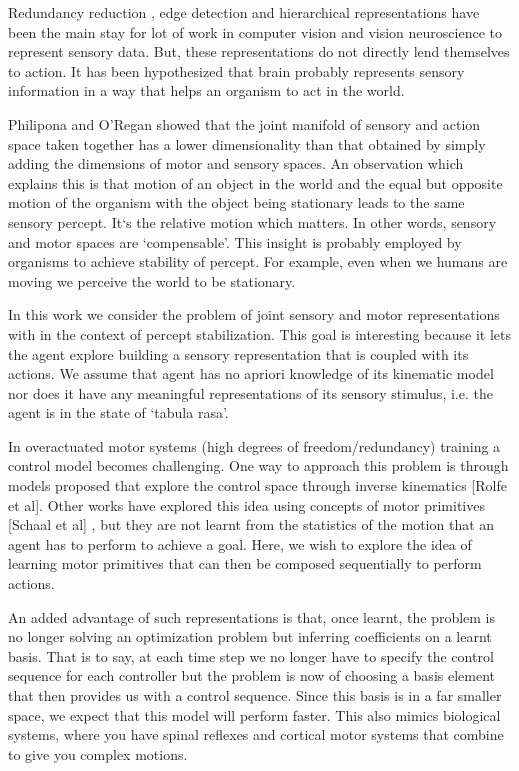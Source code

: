 \documentclass[conference]{IEEEtran}
\begin{document}

\IEEEpeerreviewmaketitle

Redundancy reduction \cite{barlow1961possible}, edge detection \cite{hubel1968receptive}  and hierarchical representations \cite{krizhevsky2012imagenet} have been the main stay for lot of work in computer vision and vision neuroscience to represent sensory data. But, these representations do not directly lend themselves to action. It has been hypothesized \cite{o2001sensorimotor} that brain probably represents sensory information in a way that helps an organism to act in the world.  

Philipona and O'Regan \cite{philipona2003there,philipona2003perception} showed that the joint manifold of sensory and action space taken together has a lower dimensionality than that obtained by simply adding the dimensions of motor and sensory spaces. An observation which explains this is that motion of an object in the world and the equal but opposite motion of the organism with the object being stationary leads to the same sensory percept. It`s the relative motion which matters. In other words, sensory and motor spaces are `compensable'. This insight is probably employed by organisms to achieve stability of percept. For example, even when we humans are moving we perceive the world to be stationary. 


In this work we consider the problem of joint sensory and motor representations with in the context of percept stabilization.  This goal is interesting because it lets the agent explore building a sensory representation that is coupled with its actions. We assume that agent has no apriori knowledge of its kinematic model nor does it have any meaningful representations of its sensory stimulus, i.e. the agent is in the state of `tabula rasa'.  


In overactuated motor systems (high degrees of freedom/redundancy) training a control model becomes challenging. One way to approach this problem is through models proposed that explore the control space through inverse kinematics [Rolfe et al]. Other works have explored this idea using concepts of motor primitives [Schaal et al] , but they are not learnt from the statistics of the motion that an agent has to perform to achieve a goal.  Here, we wish to explore the idea of learning motor primitives that can then be composed sequentially to perform actions.

An added advantage of such representations is that, once learnt, the problem is no longer solving an optimization problem but inferring coefficients on a learnt basis. That is to say, at each time step we no longer have to specify the control sequence for each controller but the problem is now of choosing a basis element that then provides us with a control sequence. Since this basis is in a far smaller space, we expect that this model will perform faster. This also mimics biological systems, where you have spinal reflexes and cortical motor systems that combine to give you complex motions\cite{kandel2000principles}. 
\end{document}
